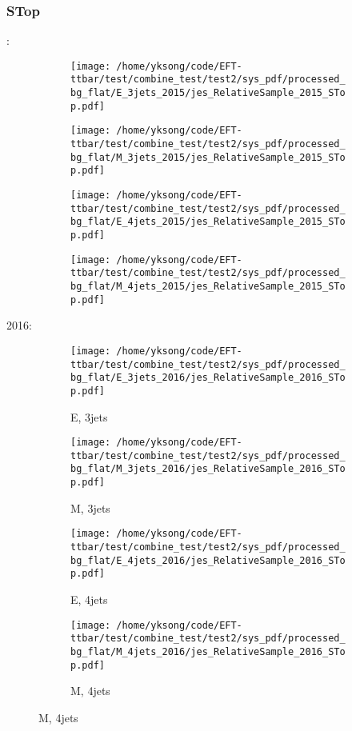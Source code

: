 \documentclass{beamer}
\begin{document}
\begin{frame}
\frametitle{STop}
\fontsize{5}{1}:
\begin{figure}
\centering
\begin{subfigure}[b]{0.24\textwidth}
\texttt{[image: /home/yksong/code/EFT-ttbar/test/combine\_test/test2/sys\_pdf/processed\_bg\_flat/E\_3jets\_2015/jes\_RelativeSample\_2015\_STop.pdf]}
\end{subfigure}
\begin{subfigure}[b]{0.24\textwidth}
\texttt{[image: /home/yksong/code/EFT-ttbar/test/combine\_test/test2/sys\_pdf/processed\_bg\_flat/M\_3jets\_2015/jes\_RelativeSample\_2015\_STop.pdf]}
\end{subfigure}
\begin{subfigure}[b]{0.24\textwidth}
\texttt{[image: /home/yksong/code/EFT-ttbar/test/combine\_test/test2/sys\_pdf/processed\_bg\_flat/E\_4jets\_2015/jes\_RelativeSample\_2015\_STop.pdf]}
\end{subfigure}
\begin{subfigure}[b]{0.24\textwidth}
\texttt{[image: /home/yksong/code/EFT-ttbar/test/combine\_test/test2/sys\_pdf/processed\_bg\_flat/M\_4jets\_2015/jes\_RelativeSample\_2015\_STop.pdf]}
\end{subfigure}
\end{figure}
2016:
\begin{figure}
\centering
\begin{subfigure}[b]{0.24\textwidth}
\texttt{[image: /home/yksong/code/EFT-ttbar/test/combine\_test/test2/sys\_pdf/processed\_bg\_flat/E\_3jets\_2016/jes\_RelativeSample\_2016\_STop.pdf]}
\captionsetup{font=tiny}
\caption{E, 3jets}
\end{subfigure}
\begin{subfigure}[b]{0.24\textwidth}
\texttt{[image: /home/yksong/code/EFT-ttbar/test/combine\_test/test2/sys\_pdf/processed\_bg\_flat/M\_3jets\_2016/jes\_RelativeSample\_2016\_STop.pdf]}
\captionsetup{font=tiny}
\caption{M, 3jets}
\end{subfigure}
\begin{subfigure}[b]{0.24\textwidth}
\texttt{[image: /home/yksong/code/EFT-ttbar/test/combine\_test/test2/sys\_pdf/processed\_bg\_flat/E\_4jets\_2016/jes\_RelativeSample\_2016\_STop.pdf]}
\captionsetup{font=tiny}
\caption{E, 4jets}
\end{subfigure}
\begin{subfigure}[b]{0.24\textwidth}
\texttt{[image: /home/yksong/code/EFT-ttbar/test/combine\_test/test2/sys\_pdf/processed\_bg\_flat/M\_4jets\_2016/jes\_RelativeSample\_2016\_STop.pdf]}
\captionsetup{font=tiny}
\caption{M, 4jets}
\end{subfigure}
\end{figure}
\end{frame}
\end{document}
